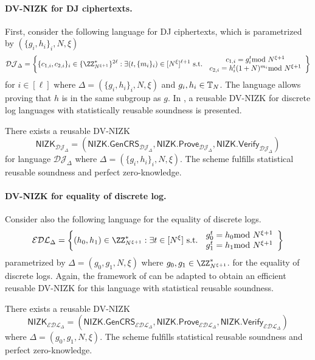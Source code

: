  \paragraph{DV-NIZK for DJ ciphertexts.} First, consider the following language for DJ ciphertexts, which is parametrized by $(\{g_i,h_i\}_i,N,\xi)$ 
$$     {\mathcal{DJ}_\Delta}= \left\{\{c_{1,i},c_{2,i}\}_i\in \{\ZZ^\ast_{N^{\xi+1}}\}^{2\ell}
:\exists( t,\{m_i\}_i )\in [N^\xi]^{\ell+1}
\text{ s.t. }\begin{array}{c}
       c_{1,i}=g_i^t\smod N^{\xi+1} \\
       c_{2,i}=h_i^t(1+N)^{m_i}\smod N^{\xi+1}
 \end{array}\right\}
$$ for $i\in [\ell]$ where $\Delta=(\{g_i,h_i\}_i,N,\xi)$ and   $g_i,h_i\in\mathbb{T}_N$. 
The language allows proving that $h$ is in the same subgroup as $g$. In \cite{EC:CraSho02}, a reusable DV-NIZK for discrete log languages with statistically reusable soundness is presented. 


\begin{lemma}
\label{lemma:DLforDJ}
There exists a reusable DV-NIZK $$\mathsf{NIZK}_{\mathcal{DJ}_\Delta}=(\mathsf{NIZK.GenCRS}_{\mathcal{DJ}_\Delta},\mathsf{NIZK.Prove}_{\mathcal{DJ}_\Delta},\mathsf{NIZK.Verify}_{\mathcal{DJ}_\Delta})$$ for language ${\mathcal{DJ}_\Delta}$ where $\Delta=(\{g_i,h_i\}_i,N,\xi)$. The scheme fulfills statistical reusable soundness and perfect zero-knowledge.
\end{lemma}


\paragraph{DV-NIZK for equality of discrete log.} Consider also the following language for the equality of discrete logs.
$$\mathcal{EDL}_\Delta=\left\{(h_0,h_1)\in\ZZ^\ast_{N^{\xi+1}}
:\exists t\in [N^\xi] \text{ s.t. }
\begin{array}{c}
    g_0^t=h_0\smod N^{\xi+1}  \\
     g_1^t=h_1\smod N^{\xi+1}
\end{array}
\right\}$$
parametrized by $\Delta=(g_0,g_1,N,\xi)$ where $g_0,g_1\in\ZZ^\ast_{N^{\xi+1}}$. for the equality of discrete logs. Again, the framework of \cite{EC:CraSho02} can be adapted to obtain an efficient reusable DV-NIZK for this language with statistical reusable soundness.

\begin{lemma}
\label{lemma:EDLforDJ}
There exists a reusable DV-NIZK $$\mathsf{NIZK}_{\mathcal{EDL}_\Delta}=(\mathsf{NIZK.GenCRS}_{\mathcal{EDL}_\Delta},\mathsf{NIZK.Prove}_{\mathcal{EDL}_\Delta},\mathsf{NIZK.Verify}_{\mathcal{EDL}_\Delta})$$ where $\Delta=(g_0,g_1,N,\xi)$. The scheme fulfills statistical reusable soundness and perfect zero-knowledge.
\end{lemma}





